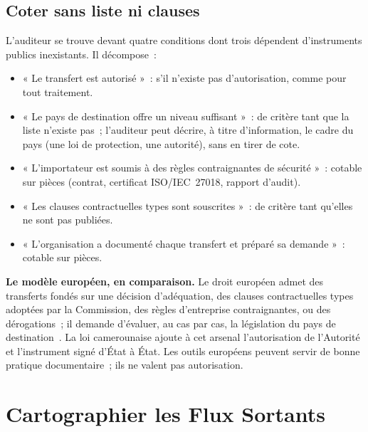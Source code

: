 \subsection{Coter sans liste ni clauses}

L'auditeur se trouve devant quatre conditions dont trois dépendent
d'instruments publics inexistants. Il décompose~:

\begin{itemize}
    \item « Le transfert est autorisé »~: \NON{} s'il n'existe pas
          d'autorisation, comme pour tout traitement.
    \item « Le pays de destination offre un niveau suffisant »~: \NEK{} de
          critère tant que la liste n'existe pas~; l'auditeur peut décrire,
          à titre d'information, le cadre du pays (une loi de protection,
          une autorité), sans en tirer de cote.
    \item « L'importateur est soumis à des règles contraignantes de
          sécurité »~: cotable sur pièces (contrat, certificat ISO/IEC~27018,
          rapport d'audit).
    \item « Les clauses contractuelles types sont souscrites »~: \NEK{} de
          critère tant qu'elles ne sont pas publiées.
    \item « L'organisation a documenté chaque transfert et préparé sa
          demande »~: cotable sur pièces.
\end{itemize}

\begin{boxinfo}
\textbf{Le modèle européen, en comparaison.} Le droit européen admet des
transferts fondés sur une décision d'adéquation, des clauses
contractuelles types adoptées par la Commission, des règles d'entreprise
contraignantes, ou des dérogations~; il demande d'évaluer, au cas par cas,
la législation du pays de destination~\cite{edpb2020transferts}. La loi
camerounaise ajoute à cet arsenal l'autorisation de l'Autorité et
l'instrument signé d'État à État. Les outils européens peuvent servir de
bonne pratique documentaire~; ils ne valent pas autorisation.
\end{boxinfo}

\section{Cartographier les Flux Sortants}
\label{sec:c11-flux}

